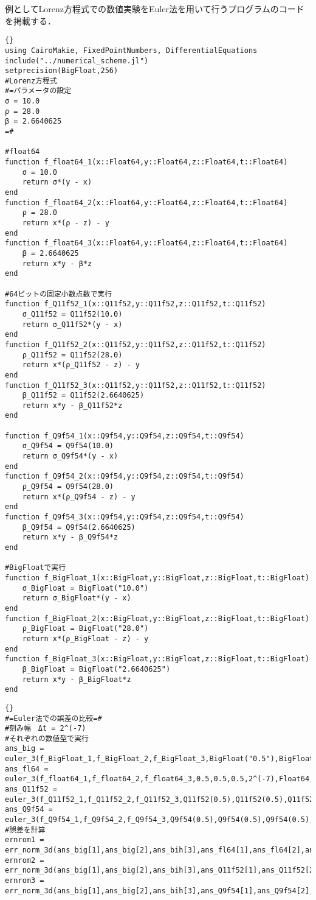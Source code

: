 例としてLorenz方程式での数値実験をEuler法を用いて行うプログラムのコードを掲載する．

\begin{lstlisting}[caption=\text{Lorenz方程式の関数を定義},label=code_lorenz]{}
using CairoMakie, FixedPointNumbers, DifferentialEquations
include("../numerical_scheme.jl")
setprecision(BigFloat,256)
#Lorenz方程式
#=パラメータの設定
σ = 10.0
ρ = 28.0
β = 2.6640625
=#

#float64
function f_float64_1(x::Float64,y::Float64,z::Float64,t::Float64)
    σ = 10.0
    return σ*(y - x)
end
function f_float64_2(x::Float64,y::Float64,z::Float64,t::Float64)
    ρ = 28.0
    return x*(ρ - z) - y
end
function f_float64_3(x::Float64,y::Float64,z::Float64,t::Float64)
    β = 2.6640625
    return x*y - β*z
end

#64ビットの固定小数点数で実行
function f_Q11f52_1(x::Q11f52,y::Q11f52,z::Q11f52,t::Q11f52)
    σ_Q11f52 = Q11f52(10.0)
    return σ_Q11f52*(y - x)
end
function f_Q11f52_2(x::Q11f52,y::Q11f52,z::Q11f52,t::Q11f52)
    ρ_Q11f52 = Q11f52(28.0)
    return x*(ρ_Q11f52 - z) - y
end
function f_Q11f52_3(x::Q11f52,y::Q11f52,z::Q11f52,t::Q11f52)
    β_Q11f52 = Q11f52(2.6640625)
    return x*y - β_Q11f52*z
end

function f_Q9f54_1(x::Q9f54,y::Q9f54,z::Q9f54,t::Q9f54)
    σ_Q9f54 = Q9f54(10.0)
    return σ_Q9f54*(y - x)    
end
function f_Q9f54_2(x::Q9f54,y::Q9f54,z::Q9f54,t::Q9f54)
    ρ_Q9f54 = Q9f54(28.0)
    return x*(ρ_Q9f54 - z) - y
end
function f_Q9f54_3(x::Q9f54,y::Q9f54,z::Q9f54,t::Q9f54)
    β_Q9f54 = Q9f54(2.6640625)
    return x*y - β_Q9f54*z
end

#BigFloatで実行
function f_BigFloat_1(x::BigFloat,y::BigFloat,z::BigFloat,t::BigFloat)
    σ_BigFloat = BigFloat("10.0")
    return σ_BigFloat*(y - x)
end
function f_BigFloat_2(x::BigFloat,y::BigFloat,z::BigFloat,t::BigFloat)
    ρ_BigFloat = BigFloat("28.0")
    return x*(ρ_BigFloat - z) - y
end
function f_BigFloat_3(x::BigFloat,y::BigFloat,z::BigFloat,t::BigFloat)
    β_BigFloat = BigFloat("2.6640625")
    return x*y - β_BigFloat*z
end
\end{lstlisting}

\begin{lstlisting}[caption={誤差を計算}, label=code_error]{}
#=Euler法での誤差の比較=#
#刻み幅　Δt = 2^(-7)
#それぞれの数値型で実行
ans_big = euler_3(f_BigFloat_1,f_BigFloat_2,f_BigFloat_3,BigFloat("0.5"),BigFloat("0.5"),BigFloat("0.5"),BigFloat(2^(-7)),BigFloat,Int(2^14))
ans_fl64 = euler_3(f_float64_1,f_float64_2,f_float64_3,0.5,0.5,0.5,2^(-7),Float64,Int(2^14))
ans_Q11f52 = euler_3(f_Q11f52_1,f_Q11f52_2,f_Q11f52_3,Q11f52(0.5),Q11f52(0.5),Q11f52(0.5),2^(-7),Q11f52,Int(2^14))
ans_Q9f54 = euler_3(f_Q9f54_1,f_Q9f54_2,f_Q9f54_3,Q9f54(0.5),Q9f54(0.5),Q9f54(0.5),2^(-7),Q9f54,Int(2^14))
#誤差を計算
ernrom1 = err_norm_3d(ans_big[1],ans_big[2],ans_bih[3],ans_fl64[1],ans_fl64[2],ans_fl64[])
ernrom2 = err_norm_3d(ans_big[1],ans_big[2],ans_bih[3],ans_Q11f52[1],ans_Q11f52[2],ans_Q11f52[])
ernrom3 = err_norm_3d(ans_big[1],ans_big[2],ans_bih[3],ans_Q9f54[1],ans_Q9f54[2],ans_Q9f54[])
\end{lstlisting}